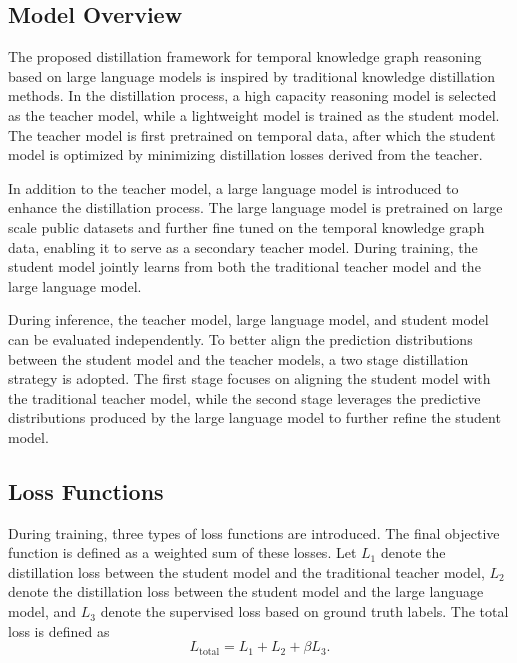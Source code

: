 \documentclass[11pt]{article}
\begin{document}
\subsection{Model Overview}

The proposed distillation framework for temporal knowledge graph reasoning based on large language models is inspired by traditional knowledge distillation methods. In the distillation process, a high capacity reasoning model is selected as the teacher model, while a lightweight model is trained as the student model. The teacher model is first pretrained on temporal data, after which the student model is optimized by minimizing distillation losses derived from the teacher.

In addition to the teacher model, a large language model is introduced to enhance the distillation process. The large language model is pretrained on large scale public datasets and further fine tuned on the temporal knowledge graph data, enabling it to serve as a secondary teacher model. During training, the student model jointly learns from both the traditional teacher model and the large language model.

During inference, the teacher model, large language model, and student model can be evaluated independently. To better align the prediction distributions between the student model and the teacher models, a two stage distillation strategy is adopted. The first stage focuses on aligning the student model with the traditional teacher model, while the second stage leverages the predictive distributions produced by the large language model to further refine the student model.

\subsection{Loss Functions}

During training, three types of loss functions are introduced. The final objective function is defined as a weighted sum of these losses. Let $L_1$ denote the distillation loss between the student model and the traditional teacher model, $L_2$ denote the distillation loss between the student model and the large language model, and $L_3$ denote the supervised loss based on ground truth labels. The total loss is defined as
\begin{equation}
L_{\text{total}} = L_1 + L_2 + \beta L_3 .
\end{equation}
\end{document}

